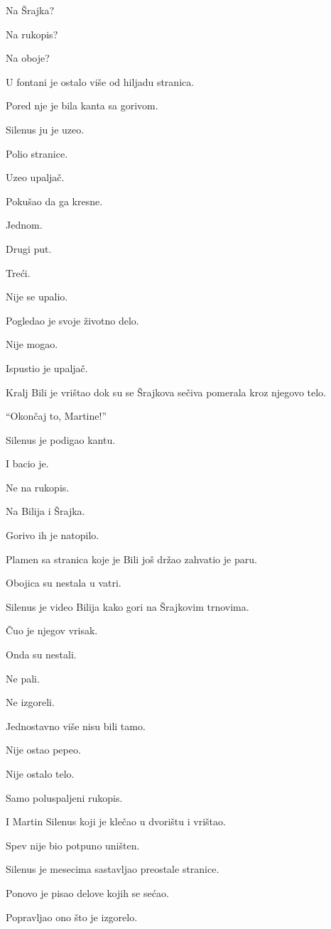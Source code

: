 Na Šrajka?

Na rukopis?

Na oboje?

U fontani je ostalo više od hiljadu stranica.

Pored nje je bila kanta sa gorivom.

Silenus ju je uzeo.

Polio stranice.

Uzeo upaljač.

Pokušao da ga kresne.

Jednom.

Drugi put.

Treći.

Nije se upalio.

Pogledao je svoje životno delo.

Nije mogao.

Ispustio je upaljač.

Kralj Bili je vrištao dok su se Šrajkova sečiva pomerala kroz njegovo telo.

``Okončaj to, Martine!''

Silenus je podigao kantu.

I bacio je.

Ne na rukopis.

Na Bilija i Šrajka.

Gorivo ih je natopilo.

Plamen sa stranica koje je Bili još držao zahvatio je paru.

Obojica su nestala u vatri.

Silenus je video Bilija kako gori na Šrajkovim trnovima.

Čuo je njegov vrisak.

Onda su nestali.

Ne pali.

Ne izgoreli.

Jednostavno više nisu bili tamo.

Nije ostao pepeo.

Nije ostalo telo.

Samo poluspaljeni rukopis.

I Martin Silenus koji je klečao u dvorištu i vrištao.

\bigskip

Spev nije bio potpuno uništen.

Silenus je mesecima sastavljao preostale stranice.

Ponovo je pisao delove kojih se sećao.

Popravljao ono što je izgorelo.

